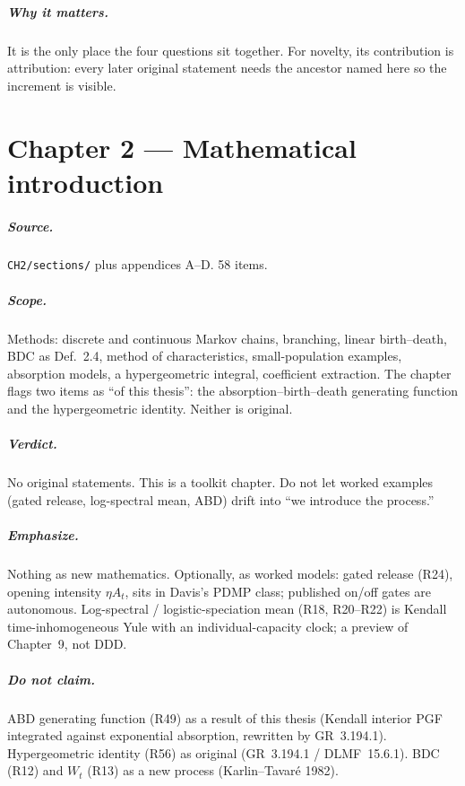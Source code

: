 \documentclass[11pt,a4paper]{report}
\begin{document}
\paragraph{Why it matters.}
It is the only place the four questions sit together. For novelty, its
contribution is attribution: every later original statement needs the
ancestor named here so the increment is visible.

\chapter{Chapter 2 --- Mathematical introduction}
\label{ch:2}

\paragraph{Source.} \texttt{CH2/sections/} plus appendices A--D.
58 items.

\paragraph{Scope.}
Methods: discrete and continuous Markov chains, branching, linear
birth--death, BDC as Def.~2.4, method of characteristics, small-population
examples, absorption models, a hypergeometric integral, coefficient
extraction. The chapter flags two items as ``of this thesis'': the
absorption--birth--death generating function and the hypergeometric
identity. Neither is original.

\paragraph{Verdict.}
No original statements. This is a toolkit chapter. Do not let worked
examples (gated release, log-spectral mean, ABD) drift into ``we
introduce the process.''

\paragraph{Emphasize.}
Nothing as new mathematics. Optionally, as worked models:
gated release (R24), opening intensity \(\eta A_t\), sits in Davis's PDMP
class; published on/off gates are autonomous. Log-spectral /
logistic-speciation mean (R18, R20--R22) is Kendall time-inhomogeneous
Yule with an individual-capacity clock; a preview of Chapter~9, not DDD.

\paragraph{Do not claim.}
ABD generating function (R49) as a result of this thesis (Kendall
interior PGF integrated against exponential absorption, rewritten by
GR~3.194.1). Hypergeometric identity (R56) as original (GR~3.194.1 /
DLMF~15.6.1). BDC (R12) and \(W_t\) (R13) as a new process
(Karlin--Tavar\'e 1982).
\end{document}
